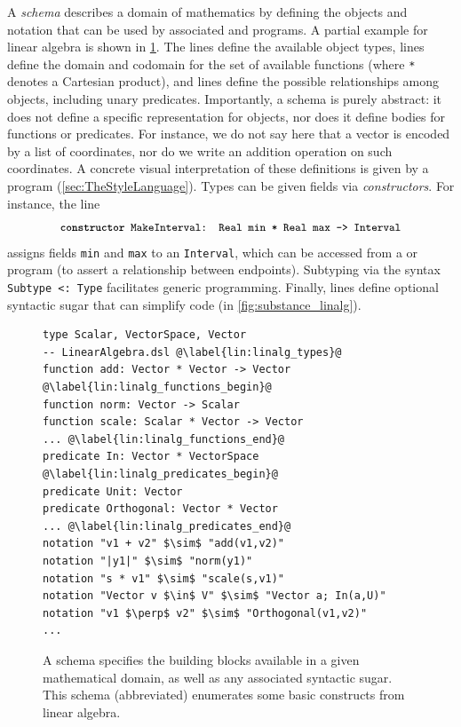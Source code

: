 A \Domain{} \emph{schema} describes a domain of mathematics by defining the objects and notation that can be used by associated \Substance{} and \Style{} programs.  A partial example for linear algebra is shown in \cref{fig:domain_linalg}.  The  lines define the available object types,  lines define the domain and codomain for the set of available functions (where \texttt{*} denotes a Cartesian product), and  lines define the possible relationships among objects, including unary predicates.  Importantly, a \Domain{} schema is purely abstract: it does not define a specific representation for objects, nor does it define bodies for functions or predicates. For instance, we do not say here that a vector is encoded by a list of coordinates, nor do we write an addition operation on such coordinates.  A concrete visual interpretation of these definitions is given by a \Style{} program (\cref{sec:TheStyleLanguage}).  Types can be given fields via \emph{constructors}. For instance, the line
\[
   \text{\small\texttt{\textbf{constructor} MakeInterval: Real min * Real max -> Interval}}
\]
assigns fields \texttt{min} and \texttt{max} to an \texttt{Interval}, which can be accessed from a \Substance{} or \Style{} program (\eg to assert a relationship between endpoints).  Subtyping via the syntax \texttt{Subtype <: Type} facilitates generic programming.  Finally,  lines define optional syntactic sugar that can simplify code (\eg in \cref{fig:substance_linalg}).

\begin{figure}
\begin{mdframed}[style=DSLCode]
\begin{lstlisting}[language=Elem,escapechar=@]
type Scalar, VectorSpace, Vector                            -- LinearAlgebra.dsl @\label{lin:linalg_types}@
function add: Vector * Vector -> Vector @\label{lin:linalg_functions_begin}@
function norm: Vector -> Scalar
function scale: Scalar * Vector -> Vector
... @\label{lin:linalg_functions_end}@
predicate In: Vector * VectorSpace @\label{lin:linalg_predicates_begin}@
predicate Unit: Vector
predicate Orthogonal: Vector * Vector
... @\label{lin:linalg_predicates_end}@
notation "v1 + v2" $\sim$ "add(v1,v2)"
notation "|y1|" $\sim$ "norm(y1)"
notation "s * v1" $\sim$ "scale(s,v1)"
notation "Vector v $\in$ V" $\sim$ "Vector a; In(a,U)"
notation "v1 $\perp$ v2" $\sim$ "Orthogonal(v1,v2)"
...
\end{lstlisting}
\end{mdframed}
   \caption{A \Domain{} schema specifies the building blocks available in a given mathematical domain, as well as any associated syntactic sugar.  This schema (abbreviated) enumerates some basic constructs from linear algebra.\label{fig:domain_linalg}}
\end{figure}


